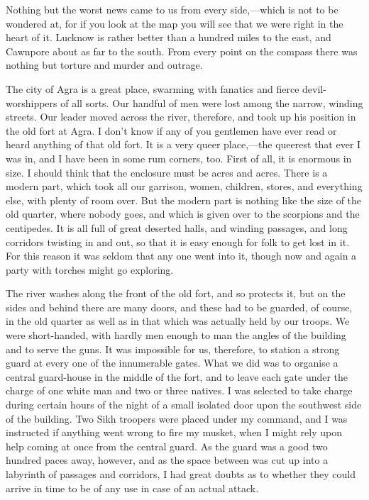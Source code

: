 Nothing but the worst news came to us from every side,—which is not to be wondered at, for if you look at the map you will see that we were right in the heart of it. Lucknow is rather better than a hundred miles to the east, and Cawnpore about as far to the south. From every point on the compass there was nothing but torture and murder and outrage.

The city of Agra is a great place, swarming with fanatics and fierce devil-worshippers of all sorts. Our handful of men were lost among the narrow, winding streets. Our leader moved across the river, therefore, and took up his position in the old fort at Agra. I don't know if any of you gentlemen have ever read or heard anything of that old fort. It is a very queer place,—the queerest that ever I was in, and I have been in some rum corners, too. First of all, it is enormous in size. I should think that the enclosure must be acres and acres. There is a modern part, which took all our garrison, women, children, stores, and everything else, with plenty of room over. But the modern part is nothing like the size of the old quarter, where nobody goes, and which is given over to the scorpions and the centipedes. It is all full of great deserted halls, and winding passages, and long corridors twisting in and out, so that it is easy enough for folk to get lost in it. For this reason it was seldom that any one went into it, though now and again a party with torches might go exploring.

The river washes along the front of the old fort, and so protects it, but on the sides and behind there are many doors, and these had to be guarded, of course, in the old quarter as well as in that which was actually held by our troops. We were short-handed, with hardly men enough to man the angles of the building and to serve the guns. It was impossible for us, therefore, to station a strong guard at every one of the innumerable gates. What we did was to organise a central guard-house in the middle of the fort, and to leave each gate under the charge of one white man and two or three natives. I was selected to take charge during certain hours of the night of a small isolated door upon the southwest side of the building. Two Sikh troopers were placed under my command, and I was instructed if anything went wrong to fire my musket, when I might rely upon help coming at once from the central guard. As the guard was a good two hundred paces away, however, and as the space between was cut up into a labyrinth of passages and corridors, I had great doubts as to whether they could arrive in time to be of any use in case of an actual attack.

